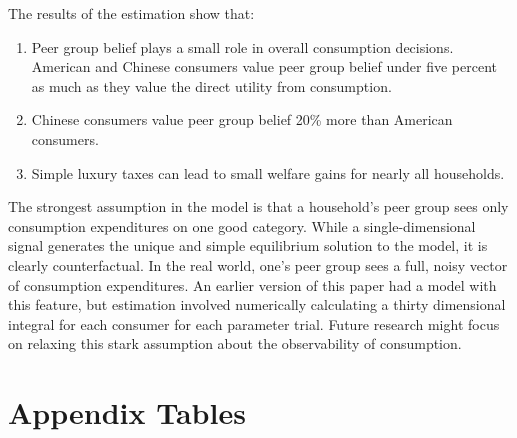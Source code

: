 The results of the estimation show that:
\begin{enumerate}
    \item Peer group belief plays a small role in overall consumption decisions.  American and Chinese consumers value peer group belief under five percent as much as they value the direct utility from consumption.
    \item Chinese consumers value peer group belief 20\% more than American consumers.
    \item Simple luxury taxes can lead to small welfare gains for nearly all households.
\end{enumerate}

The strongest assumption in the model is that a household's peer group sees only consumption expenditures on one good category.  While a single-dimensional signal generates the unique and simple equilibrium solution to the model, it is clearly counterfactual.  In the real world, one's peer group sees a full, noisy vector of consumption expenditures.  An earlier version of this paper had a model with this feature, but estimation involved numerically calculating a thirty dimensional integral for each consumer for each parameter trial.  Future research might focus on relaxing this stark assumption about the observability of consumption.

% 
% 
% 
% 

\section{Appendix Tables}
\label{sec:det_res}

